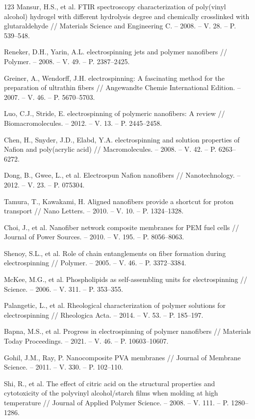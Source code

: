 \documentclass[12pt,a4paper]{report}
\begin{document}
\begin{thebibliography}{123}
 Mansur, H.S., et al. FTIR spectroscopy characterization of poly(vinyl alcohol) hydrogel with different hydrolysis degree and chemically crosslinked with glutaraldehyde // Materials Science and Engineering C. – 2008. – V. 28. – P. 539–548.

 Reneker, D.H., Yarin, A.L. electrospinning jets and polymer nanofibers // Polymer. – 2008. – V. 49. – P. 2387–2425.

 Greiner, A., Wendorff, J.H. electrospinning: A fascinating method for the preparation of ultrathin fibers // Angewandte Chemie International Edition. – 2007. – V. 46. – P. 5670–5703.

 Luo, C.J., Stride, E. electrospinning of polymeric nanofibers: A review // Biomacromolecules. – 2012. – V. 13. – P. 2445–2458.

 Chen, H., Snyder, J.D., Elabd, Y.A. electrospinning and solution properties of Nafion and poly(acrylic acid) // Macromolecules. – 2008. – V. 42. – P. 6263–6272.

 Dong, B., Gwee, L., et al. Electrospun Nafion nanofibers // Nanotechnology. – 2012. – V. 23. – P. 075304.

 Tamura, T., Kawakami, H. Aligned nanofibers provide a shortcut for proton transport // Nano Letters. – 2010. – V. 10. – P. 1324–1328.

 Choi, J., et al. Nanofiber network composite membranes for PEM fuel cells // Journal of Power Sources. – 2010. – V. 195. – P. 8056–8063.

 Shenoy, S.L., et al. Role of chain entanglements on fiber formation during electrospinning // Polymer. – 2005. – V. 46. – P. 3372–3384.

 McKee, M.G., et al. Phospholipids as self-assembling units for electrospinning // Science. – 2006. – V. 311. – P. 353–355.

 Palangetic, L., et al. Rheological characterization of polymer solutions for electrospinning // Rheologica Acta. – 2014. – V. 53. – P. 185–197.

 Bapna, M.S., et al. Progress in electrospinning of polymer nanofibers // Materials Today Proceedings. – 2021. – V. 46. – P. 10603–10607.

 Gohil, J.M., Ray, P. Nanocomposite PVA membranes // Journal of Membrane Science. – 2011. – V. 330. – P. 102–110.

 Shi, R., et al. The effect of citric acid on the structural properties and cytotoxicity of the polyvinyl alcohol/starch films when molding at high temperature // Journal of Applied Polymer Science. – 2008. – V. 111. – P. 1280–1286.


\end{thebibliography}
\end{document}
